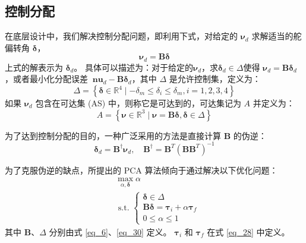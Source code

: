 \subsection{控制分配}
在底层设计中，我们解决控制分配问题，即利用下式，对给定的 ${{\boldsymbol{\nu }}_{d}}$ 求解适当的舵偏转角 $\boldsymbol{\delta }$，
\begin{equation}
	{\boldsymbol {\nu}_d}={\boldsymbol{B\delta}}
	\label{eq_29.5}
\end{equation}
上式的解表示为 $\boldsymbol{\delta }_d$。 具体可以描述为：对于给定的${{\boldsymbol{\nu }}_{d}}$，求${{\boldsymbol{\delta }}_{d}}\in \Delta $使得 ${{\boldsymbol{\nu }}_{d}}=\boldsymbol{B}{{\boldsymbol{\delta }}_{d}}$，或者最小化分配误差 ${{\boldsymbol{\ nu }}_{d}}-\boldsymbol{B}{{\boldsymbol{\delta }}_{d}}$，其中 $\Delta $ 是允许控制集，定义为：
\begin{equation}
	\Delta=\left\{\boldsymbol{\delta} \in \mathbb{R}^{4} \mid-\delta_{m} \leq \delta_{i} \leq \delta_{m}, i=1,2,3,4\right\}
	\label{eq_30}
\end{equation}
如果 ${{\boldsymbol{\nu }}_{d}}$ 包含在可达集 (AS) 中，则称它是可达到的，可达集记为 $A$ 并定义为：
\begin{equation}
	A=\left\{\boldsymbol{\nu} \in \mathbb{R}^{3} \mid \boldsymbol{\nu}=\boldsymbol{B} \boldsymbol{\delta}, \boldsymbol{\delta} \in \Delta\right\}
	\label{eq_31}
\end{equation}

为了达到控制分配的目的，一种广泛采用的方法是直接计算 $\boldsymbol{B}$ 的伪逆：
\begin{equation}
	{{\boldsymbol{\delta }}_d} = {{\boldsymbol{B}}^\dag }{{\boldsymbol{\nu }}_d},   \quad  {{\boldsymbol{B}}^\dag } = {{\boldsymbol{B}}^T}{\left( {{\boldsymbol{B}}{{\boldsymbol{B}}^T}} \right)^{ - 1}}
	\label{eq_32}
\end{equation}


为了克服伪逆的缺点，所提出的 PCA 算法倾向于通过解决以下优化问题：
\begin{equation}
	\begin{aligned}
	&\max _{\alpha, \boldsymbol{\delta}} \alpha\\
	&\text { s.t. }\left\{\begin{array}{l}
	\boldsymbol{\delta} \in \Delta \\
	\boldsymbol{B} \boldsymbol{\delta}=\boldsymbol{\tau}_{i}+\alpha \boldsymbol{\tau}_{f} \\
	0 \leq \alpha \leq 1
	\end{array}\right.
	\end{aligned}
	\label{eq_pca}
\end{equation}
其中 $ \boldsymbol{B} $、$ \Delta $ 分别由式 \eqref{eq_6}、\eqref{eq_30} 定义。 $ \boldsymbol{\tau}_{i} $ 和 $ \boldsymbol{\tau}_{f} $ 在式 \eqref{eq_28} 中定义。




